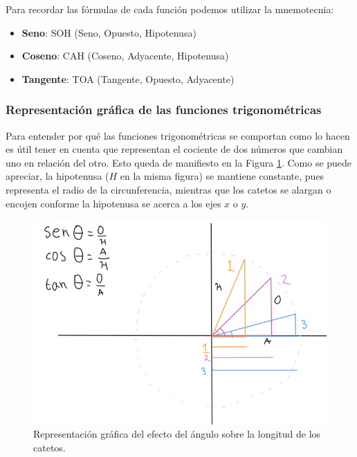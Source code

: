 \documentclass[
]{book}
\providecommand{\tightlist}{%
  \setlength{\itemsep}{0pt}\setlength{\parskip}{0pt}}
\begin{document}
Para recordar las fórmulas de cada función podemos utilizar la mnemotecnia:

\begin{itemize}
\tightlist
\item
  \textbf{Seno}: SOH (Seno, Opuesto, Hipotenusa)
\item
  \textbf{Coseno}: CAH (Coseno, Adyacente, Hipotenusa)
\item
  \textbf{Tangente}: TOA (Tangente, Opuesto, Adyacente)
\end{itemize}

\hypertarget{representaciuxf3n-gruxe1fica-de-las-funciones-trigonomuxe9tricas}{%
\subsubsection{Representación gráfica de las funciones trigonométricas}\label{representaciuxf3n-gruxe1fica-de-las-funciones-trigonomuxe9tricas}}

Para entender por qué las funciones trigonométricas se comportan como lo hacen es útil tener en cuenta que representan el cociente de dos números que cambian uno en relación del otro. Esto queda de manifiesto en la Figura \ref{fig:catetos}. Como se puede apreciar, la hipotenusa (\(H\) en la misma figura) se mantiene constante, pues representa el radio de la circunferencia, mientras que los catetos se alargan o encojen conforme la hipotenusa se acerca a los ejes \(x\) o \(y\).

\begin{figure}

{\centering \includegraphics{Unidad-I/Func-trigo} 

}

\caption{Representación gráfica del efecto del ángulo sobre la longitud de los catetos.}\label{fig:catetos}
\end{figure}
\end{document}
